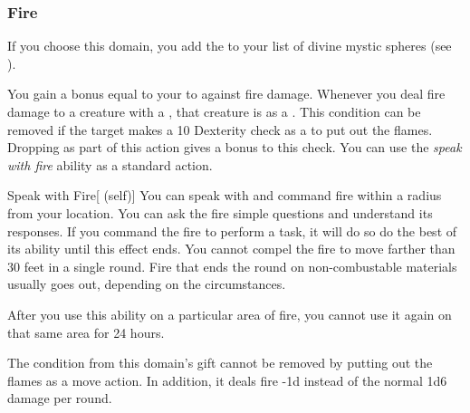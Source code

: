         \subsubsection{Fire}
            If you choose this domain, you add the   to your list of divine mystic spheres (see ).

             You gain a bonus equal to your  to  against fire damage.
             Whenever you deal fire damage to a creature with a , that creature is  as a .
            This condition can be removed if the target makes a  10 Dexterity check as a  to put out the flames.
            Dropping  as part of this action gives a  bonus to this check.
             You can use the \textit{speak with fire} ability as a standard action.
            \begin{attuneability}{Speak with Fire}[ (self)]
                You can speak with and command fire within a \areahuge radius  from your location.
                You can ask the fire simple questions and understand its responses.
                If you command the fire to perform a task, it will do so do the best of its ability until this effect ends.
                You cannot compel the fire to move farther than 30 feet in a single round.
                Fire that ends the round on non-combustable materials usually goes out, depending on the circumstances.

                After you use this ability on a particular area of fire, you cannot use it again on that same area for 24 hours.
            \end{attuneability}
             The  condition from this domain's gift cannot be removed by putting out the flames as a move action.
            In addition, it deals fire  -1d instead of the normal 1d6 damage per round.

